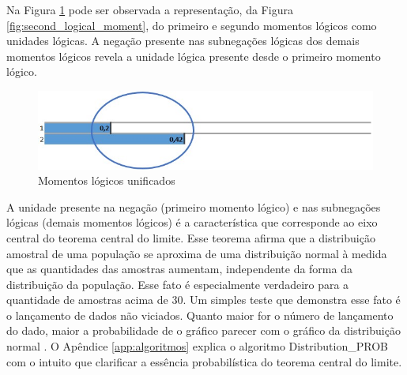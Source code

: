 Na Figura \ref{fig:logical_units} pode ser observada a representação, da Figura \ref{fig:second_logical_moment}, do primeiro e segundo momentos lógicos como unidades lógicas. A negação presente nas subnegações lógicas dos demais momentos lógicos revela a unidade lógica presente desde o primeiro momento lógico.
	\begin{figure}[H]
	\caption{Momentos lógicos unificados}
	\label{fig:logical_units}
	\centering
	\includegraphics[scale=.85]{sections/images/logical_units.jpg}
	\end{figure}

A unidade presente na negação (primeiro momento lógico) e nas subnegações lógicas (demais momentos lógicos) é a característica que corresponde ao eixo central do teorema central do limite. Esse teorema afirma que a distribuição amostral de uma população se aproxima de uma distribuição normal à medida que as quantidades das amostras aumentam, independente da forma da distribuição da população. Esse fato é especialmente verdadeiro para a quantidade de amostras acima de 30. Um simples teste que demonstra esse fato é o lançamento de dados não viciados. Quanto maior for o número de lançamento do dado, maior a probabilidade de o gráfico parecer com o gráfico da distribuição normal \cite{statisticshowto_teorema_central_limite}. O Apêndice \ref{app:algoritmos} explica o algoritmo Distribution\_PROB com o intuito que clarificar a essência probabilística do teorema central do limite.

